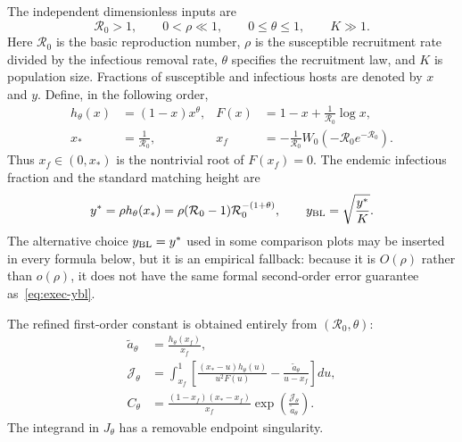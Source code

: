 \documentclass[11pt,a4paper]{article}
\newcommand{\Rzero}{\mathcal R_0}
\newcommand{\Jfun}{\mathcal J_\theta}
\newcommand{\Cfun}{C_\theta}
\newcommand{\BL}{y_{\rm BL}}
\newcommand{\xf}{x_f}
\newcommand{\xs}{x_*}
\begin{document}
The independent dimensionless inputs are
\[
 \Rzero>1,\qquad 0<\rho\ll1,\qquad 0\leq\theta\leq1,
 \qquad K\gg1.
\]
Here $\Rzero$ is the basic reproduction number, $\rho$ is the susceptible
recruitment rate divided by the infectious removal rate, $\theta$ specifies the
recruitment law, and $K$ is population size.  Fractions of susceptible and
infectious hosts are denoted by $x$ and $y$.  Define, in the following order,
\begin{align*}
 h_\theta(x)&=(1-x)x^\theta,
 &F(x)&=1-x+\frac{1}{\Rzero}\log x,\\
 \xs&=\frac1{\Rzero},
 &\xf&=-\frac1{\Rzero}W_0(-\Rzero e^{-\Rzero}).
\end{align*}
Thus $\xf\in(0,\xs)$ is the nontrivial root of $F(\xf)=0$.  The endemic
infectious fraction and the standard matching height are
\begin{equation}
 y^*=\rho h_\theta(\xs)
 =\rho(\Rzero-1)\Rzero^{-(1+\theta)},
 \qquad
 \BL=\sqrt{\frac{y^*}{K}}.
 \label{eq:exec-ybl}
\end{equation}
The alternative choice $\BL=y^*$ used in some comparison plots may be inserted
in every formula below, but it is an empirical fallback: because it is
$O(\rho)$ rather than $o(\rho)$, it does not have the same formal second-order
error guarantee as~\eqref{eq:exec-ybl}.

The refined first-order constant is obtained entirely from $(\Rzero,\theta)$:
\begin{align}
 \widetilde a_\theta&=\frac{h_\theta(\xf)}{\xf},\nonumber\\
 \Jfun&=\int_{\xf}^{1}\left[
 \frac{(\xs-u)h_\theta(u)}{u^2F(u)}
 -\frac{\widetilde a_\theta}{u-\xf}\right]du,\nonumber\\
 \Cfun&=\frac{(1-\xf)(\xs-\xf)}{\xf}
 \exp\!\left(\frac{\Jfun}{\widetilde a_\theta}\right).
 \label{eq:exec-C}
\end{align}
The integrand in $J_\theta$ has a removable endpoint singularity.
\end{document}

